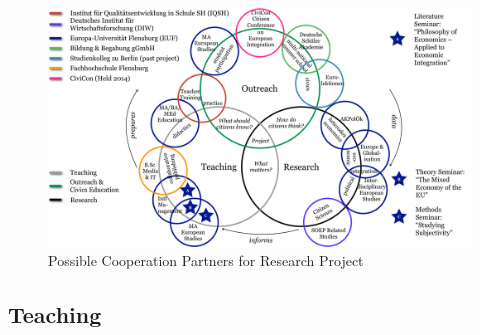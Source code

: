 \documentclass[11pt,a4paper,oneside,english]{article}
\begin{document}
\begin{landscape}
 \begin{figure}[htbp]
    \begin{center}
	\includegraphics[width=1\linewidth]{img/euf-partners}
	\caption{Possible Cooperation Partners for Research Project}
	\label{fig:euf-partners}
	\end{center}
\end{figure}
\end{landscape}

\subsection[Teaching]{Teaching} \label{sec:teaching}

\end{document}
